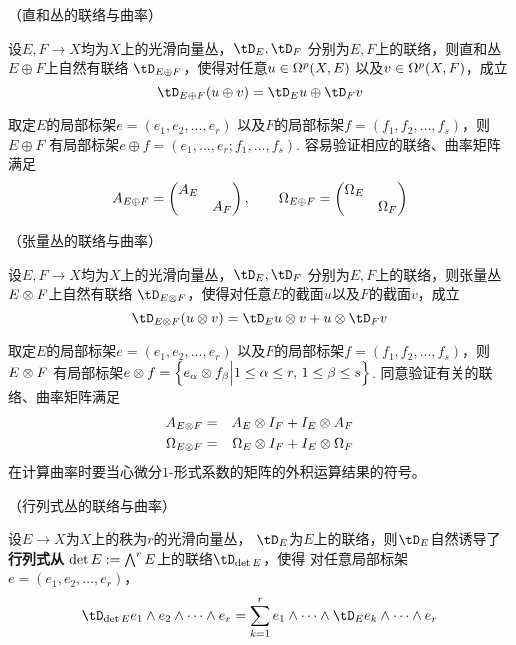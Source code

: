 \begin{Example}（直和丛的联络与曲率）

设$E,F\to X$均为$X$上的光滑向量丛，$\tD_E,\tD_F$
分别为$E,F$上的联络，则直和丛$E\oplus F$上自然有联络
$\tD_{E\oplus F}$，使得对任意$u\in \Omega^p(X,E)$
以及$v\in\Omega^p(X,F)$，成立
$$
  \tD_{E\oplus F}(u\oplus v)
=
  \tD_E u\oplus\tD_Fv
$$
\end{Example}
取定$E$的局部标架$e=(e_1,e_2,...,e_r)$
以及$F$的局部标架$f=(f_1,f_2,...,f_s)$，则$E\oplus F$
有局部标架$e\oplus f=(e_1,...,e_r;f_1,...,f_s)$.
容易验证相应的联络、曲率矩阵满足
$$
  A_{E\oplus F}
=
  \begin{pmatrix}
    A_E &  \\
        & A_F
  \end{pmatrix},
\qquad
  \Omega_{E\oplus F}
=
  \begin{pmatrix}
    \Omega_E &  \\
           & \Omega_F
  \end{pmatrix}
$$


\begin{Example}（张量丛的联络与曲率）

设$E,F\to X$均为$X$上的光滑向量丛，$\tD_E,\tD_F$
分别为$E,F$上的联络，则张量丛$E\otimes F$上自然有联络
$\tD_{E\ten F}$，使得对任意$E$的截面$u$以及$F$的截面$v$，成立
$$
  \tD_{E\ten F}(u\ten v)
=
  \tD_Eu\ten v+u\ten\tD_Fv
$$
\end{Example}

取定$E$的局部标架$e=(e_1,e_2,...,e_r)$
以及$F$的局部标架$f=(f_1,f_2,...,f_s)$，则$E\otimes F$
有局部标架$e\otimes f=\Big\{ e_\alpha\otimes f_\beta \Big| 1\leq\alpha\leq r,\,1\leq\beta\leq s  \Big\}$.
同意验证有关的联络、曲率矩阵满足
\begin{eqnarray*}
A_{E\otimes F} &=& A_E\otimes I_F+I_E\otimes A_F\\
\Omega_{E\otimes F}&=&  \Omega_E\otimes I_F+I_E\otimes\Omega_F
\end{eqnarray*}
在计算曲率时要当心微分$1$-形式系数的矩阵的外积运算结果的符号。

\begin{Example}（行列式丛的联络与曲率）

设$E\to X$为$X$上的秩为$r$的光滑向量丛，
$\tD_E$为$E$上的联络，则$\tD_E$自然诱导了\textbf{行列式从}
$\det E:=\bigwedge\nolimits^{r}E$上的联络$\tD_{\det E}$，使得
对任意局部标架$e=(e_1,e_2,...,e_r)$，
$$
  \tD_{\det E}
  e_1\wedge e_2\wedge\cdots\wedge e_r
=
  \sum_{k=1}^{r}
  e_1\wedge\cdots\wedge\tD_Ee_k\wedge\cdots\wedge e_r
$$
\end{Example}

